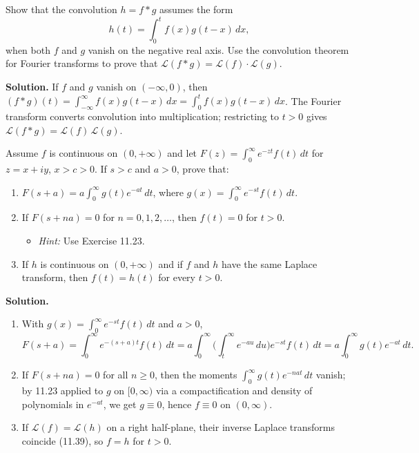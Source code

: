 \begin{problembox}
Show that the convolution $h = f * g$ assumes the form
\[
h(t) = \int_0^t f(x) g(t - x) \, dx,
\]
when both $f$ and $g$ vanish on the negative real axis. Use the convolution theorem for Fourier transforms to prove that $\mathcal{L}(f * g) = \mathcal{L}(f) \cdot \mathcal{L}(g)$.
\end{problembox}

\noindent\textbf{Solution.}
If $f$ and $g$ vanish on $(-\infty,0)$, then $(f*g)(t)=\int_{-\infty}^{\infty} f(x)g(t-x)\,dx=\int_0^t f(x)g(t-x)\,dx$. The Fourier transform converts convolution into multiplication; restricting to $t>0$ gives $\mathcal L(f*g)=\mathcal L(f)\,\mathcal L(g)$.

\begin{problembox}
Assume $f$ is continuous on $(0, +\infty)$ and let $F(z) = \int_0^\infty e^{-zt} f(t) \, dt$ for $z = x + iy$, $x > c > 0$. If $s > c$ and $a > 0$, prove that:
\begin{enumerate}[label=(\alph*)]
\item $F(s + a) = a \int_0^\infty g(t) e^{-at} \, dt$, where $g(x) = \int_0^\infty e^{-st} f(t) \, dt$.
\item If $F(s + na) = 0$ for $n = 0, 1, 2, \dots$, then $f(t) = 0$ for $t > 0$.
\begin{itemize}
\item \textit{Hint:} Use Exercise 11.23.
\end{itemize}
\item If $h$ is continuous on $(0, +\infty)$ and if $f$ and $h$ have the same Laplace transform, then $f(t) = h(t)$ for every $t > 0$.
\end{enumerate}
\end{problembox}

\noindent\textbf{Solution.}
\begin{enumerate}[label=(\alph*)]
\item With $g(x)=\int_0^{\infty} e^{-st} f(t)\,dt$ and $a>0$,
\[F(s+a)=\int_0^{\infty} e^{-(s+a)t}f(t)\,dt=a\int_0^{\infty} \Big(\int_t^{\infty} e^{-au}\,du\Big) e^{-st}f(t)\,dt=a\int_0^{\infty} g(t)e^{-at}\,dt.\]
\item If $F(s+na)=0$ for all $n\ge0$, then the moments $\int_0^{\infty} g(t) e^{-nat}\,dt$ vanish; by 11.23 applied to $g$ on $[0,\infty)$ via a compactification and density of polynomials in $e^{-at}$, we get $g\equiv0$, hence $f\equiv0$ on $(0,\infty)$.
\item If $\mathcal L(f)=\mathcal L(h)$ on a right half-plane, their inverse Laplace transforms coincide (11.39), so $f=h$ for $t>0$.
\end{enumerate}

